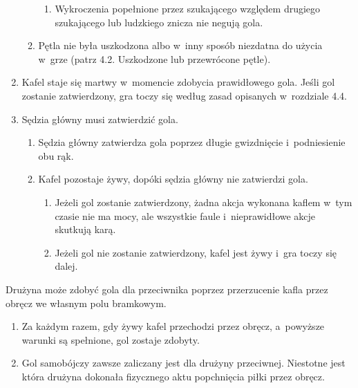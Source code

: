 \documentclass[12pt,a4paper]{article}
\renewcommand{\subsubsection}[1]{
  \oldsubsubsection{#1}%
  \leftskip1.3cm
}
\begin{document}
\begin{enumerate}
\begin{enumerate}
		            \begin{enumerate}
			            \item
			                  Wykroczenia popełnione przez szukającego względem drugiego
			                  szukającego lub ludzkiego znicza nie negują gola.
		            \end{enumerate}
		      \item
		            Pętla nie była uszkodzona albo w~inny sposób niezdatna do użycia w~grze (patrz 4.2. Uszkodzone lub przewrócone pętle).
	      \end{enumerate}
	\item
	      Kafel staje się martwy w~momencie zdobycia prawidłowego gola. Jeśli
	      gol zostanie zatwierdzony, gra toczy się według zasad opisanych w~rozdziale 4.4.
	\item
	      Sędzia główny musi zatwierdzić gola.

	      \begin{enumerate}
		      \item
		            Sędzia główny zatwierdza gola poprzez długie gwizdnięcie i~podniesienie obu rąk.
		      \item
		            Kafel pozostaje żywy, dopóki sędzia główny nie zatwierdzi gola.

		            \begin{enumerate}
			            \item
			                  Jeżeli gol zostanie zatwierdzony, żadna akcja wykonana kaflem w~tym czasie nie ma mocy, ale wszystkie faule i~nieprawidłowe akcje
			                  skutkują karą.
			            \item
			                  Jeżeli gol nie zostanie zatwierdzony, kafel jest żywy i~gra toczy
			                  się dalej.
		            \end{enumerate}
	      \end{enumerate}
\end{enumerate}

\subsubsection{Gol samobójczy}
Drużyna może zdobyć gola dla
przeciwnika poprzez przerzucenie kafla przez obręcz we własnym polu
bramkowym.

\begin{enumerate}
	\item
	      Za każdym razem, gdy żywy kafel przechodzi przez obręcz, a~powyższe
	      warunki są spełnione, gol zostaje zdobyty.
	\item
	      Gol samobójczy zawsze zaliczany jest dla drużyny przeciwnej. Niestotne
	      jest która drużyna dokonała fizycznego aktu popchnięcia piłki przez
	      obręcz.
\end{enumerate}
\end{document}
